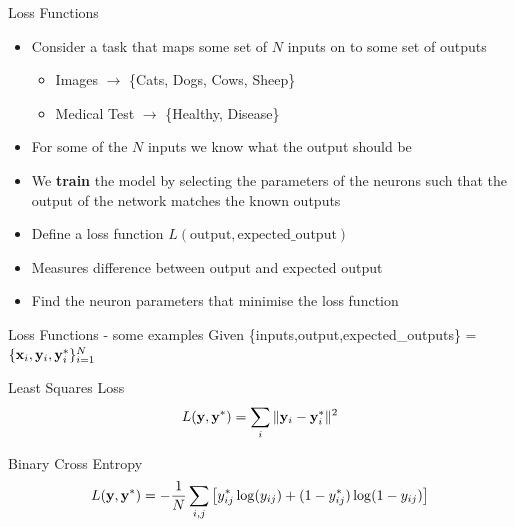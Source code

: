 \documentclass[aspectratio=169]{beamer}
\begin{document}
\begin{frame}{Loss Functions}
  \begin{itemize}
    \item Consider a task that maps some set of $N$ inputs on to some set of outputs
    \begin{itemize}
      \item Images $\rightarrow$ \{Cats, Dogs, Cows, Sheep\}
      \item Medical Test $\rightarrow$ \{Healthy, Disease\}
    \end{itemize}
    \item For some of the $N$ inputs we know what the output should be
    \item We \textbf{train} the model by selecting the parameters of the neurons such that the output of the network matches the known outputs
    \item Define a loss function $L(\mathrm{output}, \mathrm{expected\_output})$
    \item Measures difference between output and expected output
    \item Find the neuron parameters that minimise the loss function
  \end{itemize}
\end{frame}

\begin{frame}{Loss Functions - some examples}
  Given \{inputs,output,expected\_outputs\} = $\{\mathbf{x}_i,\mathbf{y}_i,\mathbf{y}^*_i\}_{i=1}^N$

      \begin{block}{Least Squares Loss}
        $$L(\mathbf{y},\mathbf{y}^*) = \sum_i \|\mathbf{y}_i-\mathbf{y}^*_i\|^2$$
      \end{block}

      \begin{block}{Binary Cross Entropy}
        $$L(\mathbf{y},\mathbf{y}^*) = -\frac{1}{N} \sum_{i,j} \left[y_{ij}^* \log(y_{ij}) + (1 - y_{ij}^*) \log(1 - y_{ij}) \right]$$
      \end{block}
   
\end{frame}
\end{document}
